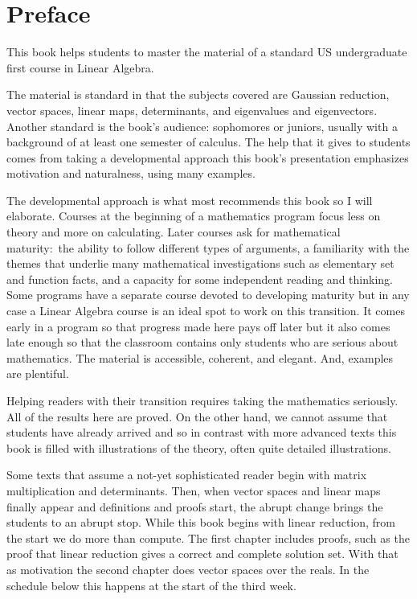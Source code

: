 {\setlength{\parskip}{.7ex}  %
\chapter*{Preface}
This book helps students to master the material of a standard 
US undergraduate first course in Linear Algebra.

The material is standard in that the subjects covered are
Gaussian reduction, 
vector spaces, linear maps,
determinants, and eigenvalues and eigenvectors.
Another standard is the book's audience:
sophomores or juniors, usually with a background 
of at least one semester of calculus. 
The help that it gives to students comes from taking a developmental 
approach\Dash 
this book's presentation emphasizes motivation and naturalness, 
using many examples.

The developmental approach is what most recommends this book
so I will elaborate.
Courses at the beginning of a mathematics program
focus less on theory and more on calculating.
Later courses
ask for mathematical maturity:~the ability to follow different 
types of arguments, 
a familiarity with
the themes that underlie many mathematical investigations such as
elementary set and function facts,
and a capacity for some independent reading and thinking.
Some programs have a separate course devoted to developing maturity but
in any case a Linear Algebra course 
is an ideal spot to work on this transition.
It comes early in a program so that progress made here pays off later
but it also comes late enough so that the classroom contains only
students who are serious about mathematics.
The material is accessible, coherent, and elegant.
And, examples are plentiful.

Helping readers with their transition 
requires taking the mathematics seriously. 
All of the results here are proved.
On the other hand, we cannot
assume that students have already arrived
and so 
in contrast with more advanced texts 
this book is filled with illustrations of the theory,
often quite detailed illustrations.

Some texts that assume a not-yet sophisticated reader
begin with matrix multiplication and determinants.
Then, when 
vector spaces and linear maps finally appear
and definitions and proofs start, the abrupt change
brings the students to an abrupt stop.
While this book begins with
linear reduction, from the start
we do more than compute.
The first chapter
includes proofs, such as the proof that linear reduction gives a correct and
complete solution set.
With that as motivation
the second chapter does vector spaces over the reals.
In the schedule below this happens at the start of the third week.

}
